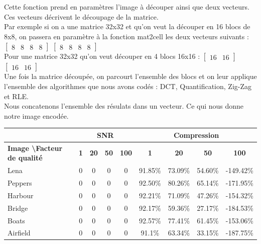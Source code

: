 \documentclass[a4paper, 12pt]{article}
\begin{document}
Cette fonction prend en paramètres l'image à découper ainsi que deux vecteurs. Ces vecteurs décrivent le découpage de la matrice. \\
Par exemple si on a une matrice 32x32 et qu'on veut la découper en 16 blocs de 8x8, on passera en paramètre à la fonction mat2cell les deux vecteurs suivants : \\
$\begin{bmatrix}
   8 & 8 & 8 & 8
\end{bmatrix}$
$\begin{bmatrix}
   8 & 8 & 8 & 8
\end{bmatrix}$ \\
Pour une matrice 32x32 qu'on veut découper en 4 blocs 16x16 :
$\begin{bmatrix}
   16 & 16
\end{bmatrix}$
$\begin{bmatrix}
   16 & 16
\end{bmatrix}$ \\
Une fois la matrice découpée, on parcourt l'ensemble des blocs et on leur applique l'ensemble des algorithmes que nous avons codés : DCT, Quantification, Zig-Zag et RLE.\\
Nous concatenons l'ensemble des résulats dans un vecteur. Ce qui nous donne notre image encodée.

\begin{center}
	\begin{tabular}{|l|c|c|c|c||c|c|c|c|}
		\hline
		& \multicolumn{4}{c||}{\bf SNR} & \multicolumn{4}{c|}{\bf Compression} \\
		\hline
		\bf Image \textbackslash Facteur de qualité & \bf 1 & \bf 20 & \bf 50 & \bf 100 & \bf 1 & \bf 20 & \bf 50 & \bf 100 \\
		\hline
		Lena                                        &     0 &      0 &      0 &       0 &     91.85\% &      73.09\% &      54.60\% &       -149.42\% \\
		\hline
		Peppers                                     &     0 &      0 &      0 &       0 &     92.50\% &      80.26\% &      65.14\% &       -171.95\% \\
		\hline
		Harbour                                     &     0 &      0 &      0 &       0 &     92.21\% &      71.09\% &      47.26\% &       -154.32\% \\
		\hline
		Bridge                                      &     0 &      0 &      0 &       0 &     92.17\% &      59.36\% &      27.17\% &       -184.53\% \\
		\hline
		Boats                                       &     0 &      0 &      0 &       0 &     92.57\% &      77.41\% &      61.45\% &       -153.06\% \\
		\hline
		Airfield                                    &     0 &      0 &      0 &       0 &      91.1\% &      63.34\% &      33.15\% &       -187.75\% \\
		\hline
	\end{tabular}
\end{center}
\end{document}
